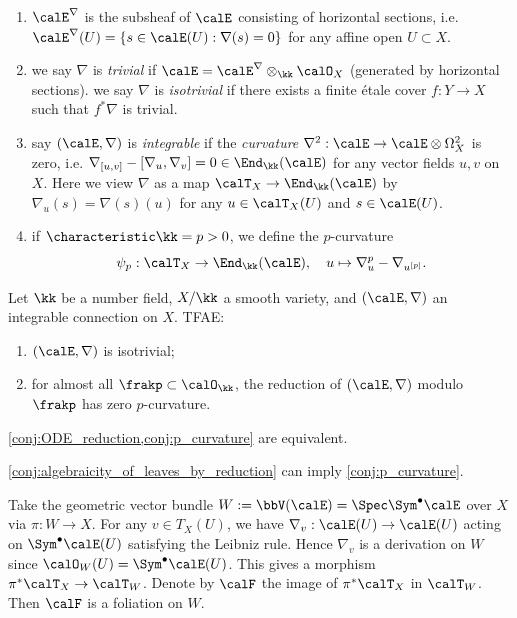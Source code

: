   \begin{definition}
    \begin{enumerate}
      \item $\calE^\nabla$ is the subsheaf of $\calE$ consisting of horizontal sections, i.e. $\calE^\nabla(U) = \{ s \in \calE(U) : \nabla(s) = 0 \}$ for any affine open $U \subset X$.
      \item we say $\nabla$ is \emph{trivial} if $\calE = \calE^\nabla \otimes_\kk \calO_X$ (generated by horizontal sections).
       we say $\nabla$ is \emph{isotrivial} if there exists a finite étale cover $f: Y \to X$ such that $f^* \nabla$ is trivial.
      \item say $(\calE, \nabla)$ is \emph{integrable} if the \emph{curvature} $\nabla^2: \calE \to \calE \otimes \Omega^2_X$ is zero, i.e. $\nabla_{[u,v]} - [\nabla_u, \nabla_v] = 0 \in \End_\kk(\calE)$ for any vector fields $u, v$ on $X$.
        Here we view $\nabla$ as a map $\calT_X \to \End_\kk(\calE)$ by $\nabla_u(s) = \nabla(s)(u)$ for any $u \in \calT_X(U)$ and $s \in \calE(U)$.
      \item if $\characteristic \kk = p > 0$, we define the $p$-curvature 
        \[ \psi_p: \calT_X \to \End_\kk(\calE), \quad u \mapsto \nabla_u^p - \nabla_{u^{[p]}}. \]
    \end{enumerate}
  \end{definition}

  \begin{conjecture}[Katz]\label{conj:p_curvature}
    Let $\kk$ be a number field, $X/\kk$ a smooth variety, and $(\calE, \nabla)$ an integrable connection on $X$.
    TFAE:
    \begin{enumerate}
      \item $(\calE, \nabla)$ is isotrivial;
      \item for almost all $\frakp \subset \calO_\kk$, the reduction of $(\calE, \nabla)$ modulo $\frakp$ has zero $p$-curvature.
    \end{enumerate}
  \end{conjecture}

  \cref{conj:ODE_reduction,conj:p_curvature} are equivalent.

  \cref{conj:algebraicity_of_leaves_by_reduction} can imply \cref{conj:p_curvature}.

  Take the geometric vector bundle $W := \bbV(\calE) = \Spec \Sym^\bullet \calE$ over $X$ via $\pi: W \to X$.
  For any $v \in T_X(U)$, we have $\nabla_v: \calE(U) \to \calE(U)$ acting on $\Sym^\bullet \calE(U)$ satisfying the Leibniz rule.
  Hence $\nabla_v$ is a derivation on $W$ since $\calO_W(U) = \Sym^\bullet \calE(U)$.
  This gives a morphism $\pi^*\calT_X \to \calT_W$.
  Denote by $\calF$ the image of $\pi^* \calT_X$ in $\calT_W$.
  Then $\calF$ is a foliation on $W$.
  